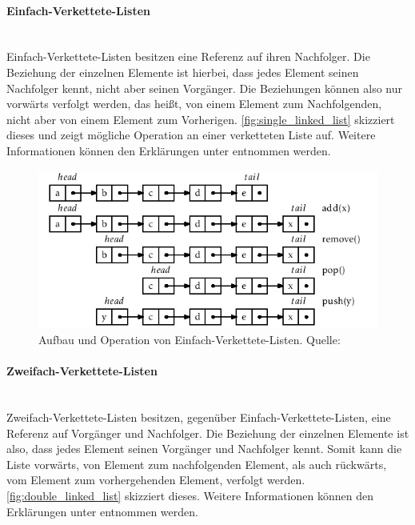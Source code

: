 \documentclass[a4paper]{article}
\begin{document}
	\paragraph{Einfach-Verkettete-Listen}\mbox{} \\
	
	Einfach-Verkettete-Listen besitzen eine Referenz auf ihren Nachfolger.
	Die Beziehung der einzelnen Elemente ist hierbei, dass jedes Element
	seinen Nachfolger kennt, nicht aber seinen Vorgänger. Die Beziehungen
	können also nur vorwärts verfolgt werden, das heißt, von einem Element
	zum Nachfolgenden, nicht aber von einem Element zum Vorherigen.
	\autoref{fig:single_linked_list} skizziert dieses und zeigt mögliche
	Operation an einer verketteten Liste auf. Weitere Informationen können
	den Erklärungen unter \cite{SLList} entnommen werden.
	
	\begin{figure}[H] 
		\includegraphics[width=\linewidth]{../Bilder/single_linked_list.jpg}
		\caption
		{
			Aufbau und Operation von Einfach-Verkettete-Listen.
			Quelle: \cite{SLList}
		}
		\label{fig:single_linked_list}
	\end{figure}	
	
	\paragraph{Zweifach-Verkettete-Listen}\mbox{} \\
	
	Zweifach-Verkettete-Listen besitzen, gegenüber Einfach-Verkettete-Listen,
	eine Referenz auf Vorgänger und Nachfolger. Die Beziehung der einzelnen
	Elemente ist also, dass jedes Element seinen Vorgänger und Nachfolger
	kennt. Somit kann die Liste vorwärts, von Element zum nachfolgenden
	Element, als auch rückwärts, vom Element zum vorhergehenden Element,
	verfolgt werden. \autoref{fig:double_linked_list} skizziert dieses.
	Weitere Informationen können den Erklärungen unter \cite{DLList} entnommen
	werden.
	
\end{document}
